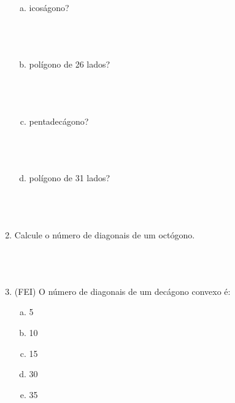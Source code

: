 \documentclass[a4paper,14pt]{article}
\begin{document}
\begin{multicols}{2}
\begin{enumerate}
\begin{enumerate}[a)]
				\item icoságono? \\\\\\\\
				\item polígono de 26 lados? \\\\\\\\
				\item pentadecágono? \\\\\\\\
				\item polígono de 31 lados? \\\\\\\\
			\end{enumerate}	
			\item Calcule o número de diagonais de um octógono. \\\\\\\\
			\item (FEI) O número de diagonais de um decágono convexo é:
			\begin{enumerate}[a)]
				\item 5
				\item 10
				\item 15
				\item 30
				\item 35
			\end{enumerate}	
		\end{enumerate}

\end{multicols}
\end{document}
